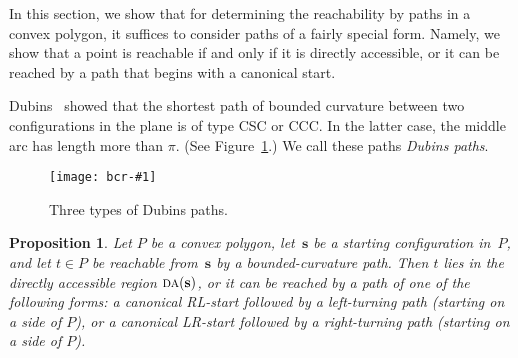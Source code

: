 \documentclass[a4paper]{article}
\newcommand{\vecs}{{\mathbf{s}}}
\DeclareMathOperator{\DA}{\textsc{da}}
\newtheorem{prop}[theorem]{Proposition}
\newcommand{\epsfigure}[2]{
  \begin{figure}[htb]
    \centerline{\texttt{[image: bcr-\#1]}}
    \caption{#2}
    \label{f:#1}
  \end{figure}}
\begin{document}
In this section, we show that for determining the reachability by
paths in a convex polygon, it suffices to consider paths of a fairly
special form. Namely, we show that a point is reachable if and only if
it is directly accessible, or it can be reached by a path that begins
with a canonical start. 

Dubins~\cite{d-cmlca-57} showed that the shortest path of
bounded curvature between two configurations in the plane
is of type CSC or CCC. In the latter case, the middle arc
has length more than $\pi$. (See Figure~\ref{f:dubins}.)
We call these paths \emph{Dubins paths}. 

\epsfigure{dubins}{Three types of Dubins paths.}


\begin{prop}\label{p:rl-enough}
  Let $P$ be a convex polygon, let~$\vecs$ be a starting configuration
  in~$P$, and let $t \in P$ be reachable from~$\vecs$ by a
  bounded-curvature path.  Then $t$ lies in the directly accessible
  region $\DA(\vecs)$, or it can be reached by a path of one of the
  following forms: a canonical RL-start followed by a left-turning
  path (starting on a side of $P$), or a canonical LR-start followed
  by a right-turning path (starting on a side of $P$).
\end{prop}
\end{document}
